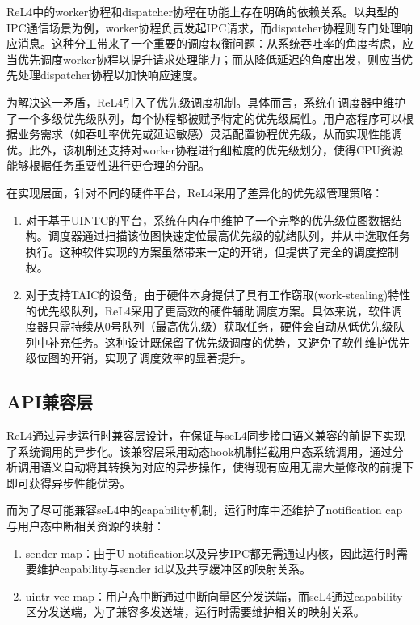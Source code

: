 ReL4中的worker协程和dispatcher协程在功能上存在明确的依赖关系。以典型的IPC通信场景为例，worker协程负责发起IPC请求，而dispatcher协程则专门处理响应消息。这种分工带来了一个重要的调度权衡问题：从系统吞吐率的角度考虑，应当优先调度worker协程以提升请求处理能力；而从降低延迟的角度出发，则应当优先处理dispatcher协程以加快响应速度。

为解决这一矛盾，ReL4引入了优先级调度机制。具体而言，系统在调度器中维护了一个多级优先级队列，每个协程都被赋予特定的优先级属性。用户态程序可以根据业务需求（如吞吐率优先或延迟敏感）灵活配置协程优先级，从而实现性能调优。此外，该机制还支持对worker协程进行细粒度的优先级划分，使得CPU资源能够根据任务重要性进行更合理的分配。

在实现层面，针对不同的硬件平台，ReL4采用了差异化的优先级管理策略：

\begin{enumerate}
  \item 对于基于UINTC的平台，系统在内存中维护了一个完整的优先级位图数据结构。调度器通过扫描该位图快速定位最高优先级的就绪队列，并从中选取任务执行。这种软件实现的方案虽然带来一定的开销，但提供了完全的调度控制权。
  \item 对于支持TAIC的设备，由于硬件本身提供了具有工作窃取(work-stealing)特性的优先级队列，ReL4采用了更高效的硬件辅助调度方案。具体来说，软件调度器只需持续从0号队列（最高优先级）获取任务，硬件会自动从低优先级队列中补充任务。这种设计既保留了优先级调度的优势，又避免了软件维护优先级位图的开销，实现了调度效率的显著提升。
\end{enumerate}


\subsection{API兼容层}

ReL4通过异步运行时兼容层设计，在保证与seL4同步接口语义兼容的前提下实现了系统调用的异步化。该兼容层采用动态hook机制拦截用户态系统调用，通过分析调用语义自动将其转换为对应的异步操作，使得现有应用无需大量修改的前提下即可获得异步性能优势。

而为了尽可能兼容seL4中的capability机制，运行时库中还维护了notification cap与用户态中断相关资源的映射：
\begin{enumerate}
  \item sender map：由于U-notification以及异步IPC都无需通过内核，因此运行时需要维护capability与sender id以及共享缓冲区的映射关系。
  \item uintr vec map：用户态中断通过中断向量区分发送端，而seL4通过capability区分发送端，为了兼容多发送端，运行时需要维护相关的映射关系。
\end{enumerate}

